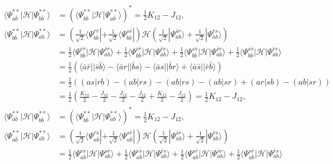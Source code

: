 \documentclass[a4paper]{book}
\newcounter{solution}[chapter]
\begin{document}
\begin{solution}
\begin{itemize}
\begin{align*}
		\langle \Psi^{**}_{a\bar{b}} | \mathscr{H} | \Psi^{**}_{b\bar{b}} \rangle &= ( \langle \Psi^{**}_{b\bar{b}} | \mathscr{H} | \Psi^{**}_{a\bar{b}} \rangle )^* =  \frac{1}{2} K_{12} - J_{12}, \\
		\langle \Psi^{**}_{b\bar{b}} | \mathscr{H} | \Psi^{**}_{ \bar{a} b} \rangle &= \left( \frac{1}{ \sqrt{2} } \langle \Psi^{ r \bar{r} }_{b \bar{b}} | + \frac{1}{ \sqrt{2} } \langle \Psi^{ s \bar{s} }_{b \bar{b}} | \right) \mathscr{H} \left( \frac{1}{ \sqrt{2} } | \Psi^{ \bar{s} r }_{\bar{a} b} \rangle + \frac{1}{ \sqrt{2} } | \Psi^{ \bar{r} s }_{\bar{a} b} \rangle \right) \\
		&= \frac{1}{2} \langle \Psi^{ r \bar{r} }_{b \bar{b}} | \mathscr{H} | \Psi^{ \bar{s} r }_{\bar{a} b} \rangle + \frac{1}{2} \langle \Psi^{ r \bar{r} }_{b \bar{b}} | \mathscr{H} | \Psi^{ \bar{r} s }_{\bar{a} b} \rangle + \frac{1}{2} \langle \Psi^{ s \bar{s} }_{b \bar{b}} | \mathscr{H} | \Psi^{ \bar{s} r }_{\bar{a} b} \rangle + \frac{1}{2} \langle \Psi^{ s \bar{s} }_{b \bar{b}} | \mathscr{H} | \Psi^{ \bar{r} s }_{\bar{a} b} \rangle \\
		&= \frac{1}{2} \left( \langle \bar{a} \bar{r} || \bar{s} \bar{b} \rangle - \langle \bar{a} r || \bar{b} s \rangle - \langle \bar{a} s || \bar{b} r \rangle + \langle \bar{a} \bar{s} || \bar{r} \bar{b} \rangle \right) \\
		&= \frac{1}{2} \left( (as|rb) - (ab|rs) - (ab|rs) - (ab|sr) + (ar|sb) - (ab|sr) \right) \\
		&= \frac{1}{2} \left( \frac{ K_{12} }{2} - \frac{ J_{12} }{2} - \frac{ J_{12} }{2} - \frac{ J_{12} }{2} + \frac{ K_{12} }{2} - \frac{ J_{12} }{2} \right) = \frac{1}{2} K_{12} - J_{12}, \\
		\langle \Psi^{**}_{\bar{a} b} | \mathscr{H} | \Psi^{**}_{b \bar{b}} \rangle &= ( \langle \Psi^{**}_{b\bar{b}} | \mathscr{H} | \Psi^{**}_{ \bar{a} b} \rangle )^* = \frac{1}{2} K_{12} - J_{12}, \\
		\langle \Psi^{**}_{a\bar{b}} | \mathscr{H} | \Psi^{**}_{ \bar{a} b} \rangle &= \left( \frac{1}{ \sqrt{2} } \langle \Psi^{ r \bar{s} }_{a \bar{b}} | + \frac{1}{ \sqrt{2} } \langle \Psi^{ s \bar{r} }_{a \bar{b}} | \right) \mathscr{H} \left( \frac{1}{ \sqrt{2} } | \Psi^{ \bar{s} r }_{\bar{a} b} \rangle + \frac{1}{ \sqrt{2} } | \Psi^{ \bar{r} s }_{\bar{a} b} \rangle \right) \\
		&= \frac{1}{2} \langle \Psi^{ r \bar{s} }_{a \bar{b}} | \mathscr{H} | \Psi^{ \bar{s} r }_{\bar{a} b} \rangle + \frac{1}{2} \langle \Psi^{ r \bar{s} }_{a \bar{b}} | \mathscr{H} | \Psi^{ \bar{r} s }_{\bar{a} b} \rangle + \frac{1}{2} \langle \Psi^{ s \bar{r} }_{a \bar{b}} | \mathscr{H} | \Psi^{ \bar{s} r }_{\bar{a} b} \rangle + \frac{1}{2} \langle \Psi^{ s \bar{r} }_{a \bar{b}} | \mathscr{H} | \Psi^{ \bar{r} s }_{\bar{a} b} \rangle \\

\end{align*}
\end{itemize}
\end{solution}
\end{document}
